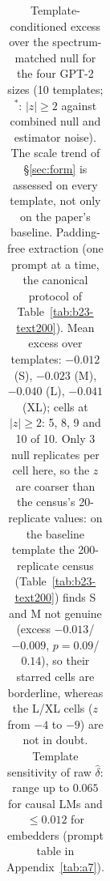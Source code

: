 \begin{table}[H]
\begin{tabular}{lcccc}
\bottomrule
\end{tabular}
\caption{Template-conditioned excess over the spectrum-matched null for the four GPT-2 sizes (10 templates; $^*$: $|z|\ge2$ against combined null and estimator noise). The scale trend of \S\ref{sec:form} is assessed on every template, not only on the paper's baseline. Padding-free extraction (one prompt at a time, the canonical protocol of Table~\ref{tab:b23-text200}). Mean excess over templates: $-0.012$ (S), $-0.023$ (M), $-0.040$ (L), $-0.041$ (XL); cells at $|z|\ge2$: 5, 8, 9 and 10 of 10. Only 3 null replicates per cell here, so the $z$ are coarser than the census's 20-replicate values: on the baseline template the 200-replicate census (Table~\ref{tab:b23-text200}) finds S and M not genuine (excess $-0.013$/$-0.009$, $p=0.09$/$0.14$), so their starred cells are borderline, whereas the L/XL cells ($z$ from $-4$ to $-9$) are not in doubt. Template sensitivity of raw $\hat\delta$: range up to $0.065$ for causal LMs and $\le0.012$ for embedders (prompt table in Appendix~\ref{tab:a7}).}
\label{tab:b14-templates}
\end{table}
